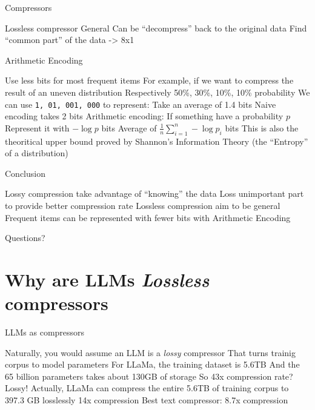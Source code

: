 \documentclass[scheme=plain]{ctexbeamer}
\begin{document}
\begin{frame}{Compressors}
  \begin{outline}
    \1 Lossless compressor
      \2 General
      \2 Can be ``decompress'' back to the original data
      \2 Find ``common part'' of the data
         -> 8x1
  \end{outline}
\end{frame}


\begin{frame}{Arithmetic Encoding}
  \begin{outline}
    \1 Use less bits for most frequent items
    \1 For example, if we want to compress the result of an uneven distribution
      \2 Respectively 50\%, 30\%, 10\%, 10\% probability
    \1 We can use \texttt{1, 01, 001, 000} to represent:
      \2 Take an average of 1.4 bits
      \2 Naive encoding takes 2 bits
    \pause
    \1 Arithmetic encoding:
      \2 If something have a probability $p$
      \2 Represent it with $- \log p$ bits
      \2 Average of $\frac{1}{n} \sum_{i=1}^{n} - \log p_i$ bits
        \3 This is also the theoritical upper bound proved by Shannon's Information Theory (the ``Entropy'' of a distribution)
  \end{outline}
\end{frame}

\begin{frame}{Conclusion}
  \begin{outline}
    \1 Lossy compression take advantage of ``knowing'' the data
      \2 Loss unimportant part to provide better compression rate
    \1 Lossless compression aim to be general
    \1 Frequent items can be represented with fewer bits with Arithmetic Encoding
  \end{outline}
\end{frame}

\begin{frame}[standout]
  Questions?
\end{frame}

\section[LLMs as compressors]{Why are LLMs \emph{Lossless} compressors}

\begin{frame}{LLMs as compressors}
  \begin{outline}
    \1 Naturally, you would assume an LLM is a \emph{lossy} compressor
      \2 That turns trainig corpus to model parameters
      \2 For LLaMa, the training dataset is 5.6TB
      \2 And the 65 billion parameters takes about 130GB of storage
        \3 So 43x compression rate?
        \3 Lossy!
    \pause
    \1 Actually, LLaMa can compress the entire 5.6TB of training corpus to 397.3 GB losslessly
      \2 14x compression
      \2 Best text compressor: 8.7x compression
  \end{outline}
\end{frame}
\end{document}
